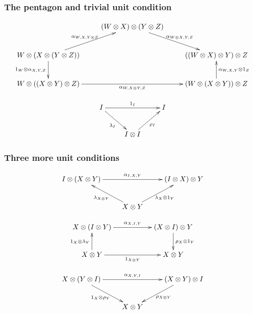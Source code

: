 \documentclass{beamer}
\begin{document}
\begin{frame}
  \frametitle{The pentagon and trivial unit condition}
  
\begin{equation}\label{pentagon}
\xymatrix{
& (W\otimes X)\otimes (Y\otimes Z) \ar[rd]^-{{\alpha_{W\otimes X,Y, Z}}}  & \\
W\otimes (X\otimes (Y\otimes Z)) \ar[ru]^-{{\alpha_{W, X,Y\otimes Z}}} \ar[d]_-{1_W\otimes {\alpha_{X, Y,Z}}} & & ((W\otimes X)\otimes Y)\otimes Z  \\
W\otimes ((X\otimes Y)\otimes Z) \ar[rr]_-{{\alpha_{W,X\otimes Y,Z}}} & &  (W\otimes (X\otimes Y))\otimes Z\ar[u]_-{{\alpha_{W,X,Y}} \otimes 1_Z} }
\end{equation}

\begin{equation}\label{unitunit}
\xymatrix{
I \ar[rd]_{\lambda_I}\ar[rr]^{1_I}   && I  \\
& I\otimes I \ar[ru]_{\rho_I} 
}
\end{equation}
\end{frame}

\begin{frame}
  \frametitle{Three more unit conditions}
\begin{equation}\label{leftunit}
\xymatrix{
 I\otimes (X\otimes Y)\ar[rr]^{\alpha_{I,X,Y}}   && (I\otimes X)\otimes Y  \\
& X\otimes Y \ar[lu]^{\lambda_{X\otimes Y}} \ar[ru]_{\lambda_{X} \otimes 1_Y}  &
}
\end{equation}

\begin{equation}\label{midunit}
\xymatrix{
 X\otimes (I\otimes Y)\ar[rr]^-{\alpha_{X,I,Y}} && (X\otimes I)\otimes Y \ar[d]^-{\rho_X \otimes 1_Y} \\
X\otimes Y \ar[u]^-{1_X\otimes \lambda_Y} \ar[rr]_-{1_{X\otimes Y}} && X\otimes Y}
\end{equation}

\begin{equation}\label{rightunit}
\xymatrix{
X\otimes (Y\otimes I) \ar[rr]^{\alpha_{X,Y,I}} \ar[rd]_{1_X\otimes \rho_Y}   && (X\otimes Y)\otimes I  \ar[ld]^{\rho_{X \otimes Y}} \\
& X\otimes Y   &
}
\end{equation}



\end{frame}
\end{document}
